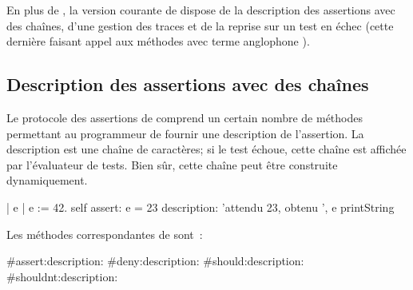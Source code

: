 \documentclass[a4paper,10pt,twoside]{book}
\begin{document}
En plus de , la version courante de \sunit dispose de la description des assertions avec des chaînes, d'une gestion des traces et de la reprise sur un test en échec 
(cette dernière faisant appel aux méthodes avec terme anglophone ).  

\subsection{Description des assertions avec des chaînes}
\label{sec:descriptionStrings}

Le protocole des assertions de  comprend un certain nombre de méthodes permettant au programmeur de fournir une description de l'assertion. La description est une chaîne de caractères; si le test échoue, cette chaîne est affichée par l'évaluateur de tests. Bien sûr, cette chaîne peut être construite dynamiquement.
\begin{code}{}
| e |
e := 42.
self assert: e = 23
	description: 'attendu 23, obtenu ', e printString
\end{code}

Les méthodes correspondantes  de  sont~:
\begin{code}{}
#assert:description:
#deny:description:
#should:description:
#shouldnt:description:
\end{code}
\end{document}
